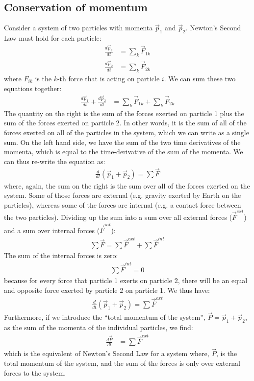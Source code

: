 \subsection{Conservation of momentum}
Consider a system of two particles with momenta $\vec p_1$ and $\vec p_2$.  Newton's Second Law must hold for each particle:
\begin{align*}
\frac{d\vec p_1}{dt}&=\sum_k \vec F_{1k}\\
\frac{d\vec p_2}{dt}&=\sum_k \vec F_{2k}
\end{align*}
where $F_{ik}$ is the $k$-th force that is acting on particle $i$.  We can sum these two equations together:
\begin{align*}
\frac{d\vec p_1}{dt}+\frac{d\vec p_2}{dt} &= \sum_k \vec F_{1k} + \sum_k \vec F_{2k}
\end{align*}
The quantity on the right is the sum of the forces exerted on particle 1 plus the sum of the forces exerted on particle 2. In other words, it is the sum of all of the forces exerted on all of the particles in the system, which we can write as a single sum. On the left hand side, we have the sum of the two time derivatives of the momenta, which is equal to the time-derivative of the sum of the momenta. We can thus re-write the equation as:
\begin{align*}
\frac{d}{dt}(\vec p_1 + \vec p_2) = \sum \vec F
\end{align*}
where, again, the sum on the right is the sum over all of the forces exerted on the system. Some of those forces are external (e.g. gravity exerted by Earth on the particles), whereas some of the forces are internal (e.g. a contact force between the two particles). Dividing up the sum into a sum over all external forces ($\vec F^{ext}$) and a sum over internal forces ($\vec F^{int}$):
\begin{align*}
\sum \vec F = \sum \vec F^{ext} + \sum \vec F^{int} 
\end{align*}
The sum of the internal forces is zero:
\begin{align*}
\sum \vec F^{int} = 0
\end{align*}
because for every force that particle 1 exerts on particle 2, there will be an equal and opposite force exerted by particle 2 on particle 1. We thus have:
\begin{align*}
\frac{d}{dt}(\vec p_1 + \vec p_2) = \sum \vec F^{ext}
\end{align*}
Furthermore, if we introduce the ``total momentum of the system'', $\vec P=\vec p_1 + \vec p_2$, as the sum of the momenta of the individual particles, we find:
\begin{align*}
\frac{d\vec P}{dt} &= \sum \vec F^{ext}
\end{align*}
which is the equivalent of Newton's Second Law for a system where, $\vec P$, is the total momentum of the system, and the sum of the forces is only over external forces to the system.

